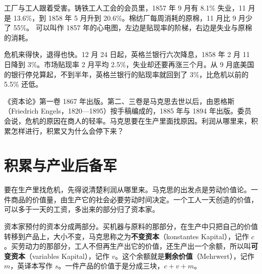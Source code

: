 工厂与工人跟着受害。铸铁工人工会的会员里，1857 年 9 月有 8.1\% 失业，11 月是 13.6\%，到 1858 年 5 月升到 20.6\%\cite{boe2017,klovland1998}。棉纺厂每周消耗的原棉，11 月比 9 月少了 55\%\cite{boe2017,klovland1998}。 可以叫作 1857 年的心电图，左边是贴现率的阶梯，右边是失业与原棉的消耗。


危机来得快，退得也快。12 月 24 日起，英格兰银行六次降息，1858 年 2 月 11 日降到 3\%\cite{boe2017}。市场贴现率 2 月平均 2.5\%，失业却还要再涨三个月\cite{boe2017,klovland1998}。从 9 月底美国的银行停兑算起，不到半年，英格兰银行的贴现率就回到了 3\%，比危机以前的 5.5\% 还低。

《资本论》第一卷 1867 年出版。第二、三卷是马克思去世以后，由恩格斯（Friedrich Engels，1820—1895）按手稿编成的，1885 年与 1894 年出版\cite{marx1885,marx1894}。委员会说，危机的原因在商人的轻率。马克思要在生产里面找原因。利润从哪里来，积累怎样进行，积累又为什么会停下来？

\section{积累与产业后备军}\label{sec:marx-accumulation}

要在生产里找危机，先得说清楚利润从哪里来。马克思的出发点是劳动价值论。一件商品的价值量，由生产它的社会必要劳动时间决定\cite{marx1867}。一个工人一天创造的价值，可以多于一天的工资，多出来的部分归了资本家。

资本家预付的资本分成两部分。买机器与原料的那部分，在生产中只把自己的价值转移到产品上，大小不变，马克思称之为\textbf{不变资本}（konstantes Kapital），记作 $c$\cite{marx1867}。买劳动力的那部分，工人不但再生产出它的价值，还生产出一个余额，所以叫\textbf{可变资本}（variables Kapital），记作 $v$\cite{marx1867}。这个余额就是\textbf{剩余价值}（Mehrwert），记作 $m$，英译本写作 $s$。一件产品的价值于是分成三块，$c+v+m$。

